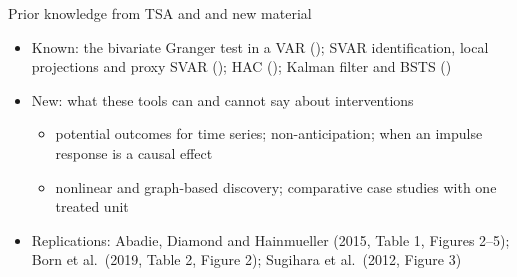 \begin{frame}{Prior knowledge from TSA and  and new material}
\itemsize{\small}
\begin{itemize}
    \item \hypertarget{c14known}{}Known: the bivariate Granger test in a VAR (); SVAR identification, local projections and proxy SVAR (); HAC (); Kalman filter and BSTS ()
    \item New: what these tools can and cannot say about interventions
    \begin{itemize}
        \item potential outcomes for time series; non-anticipation; when an impulse response is a causal effect
        \item nonlinear and graph-based discovery; comparative case studies with one treated unit
    \end{itemize}
    \item Replications: Abadie, Diamond and Hainmueller (2015, Table 1, Figures 2--5); Born et al.\ (2019, Table 2, Figure 2); Sugihara et al.\ (2012, Figure 3)
\end{itemize}
\end{frame}

